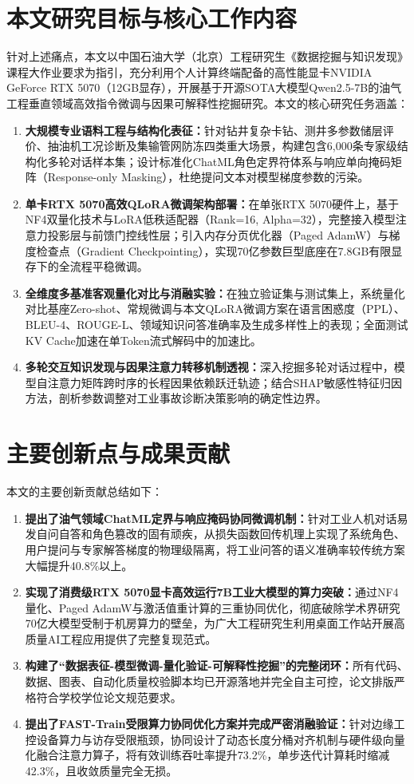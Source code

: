 \documentclass[UTF8,a4paper,zihao=-4,openany,twoside]{ctexbook}
\begin{document}
\section{本文研究目标与核心工作内容}
针对上述痛点，本文以中国石油大学（北京）工程研究生《数据挖掘与知识发现》课程大作业要求为指引，充分利用个人计算终端配备的高性能显卡NVIDIA GeForce RTX 5070（12GB显存），开展基于开源SOTA大模型Qwen2.5-7B的油气工程垂直领域高效指令微调与因果可解释性挖掘研究。本文的核心研究任务涵盖：
\begin{enumerate}
    \item \textbf{大规模专业语料工程与结构化表征：}针对钻井复杂卡钻、测井多参数储层评价、抽油机工况诊断及集输管网防冻四类重大场景，构建包含6,000条专家级结构化多轮对话样本集；设计标准化ChatML角色定界符体系与响应单向掩码矩阵（Response-only Masking），杜绝提问文本对模型梯度参数的污染。
    \item \textbf{单卡RTX 5070高效QLoRA微调架构部署：}在单张RTX 5070硬件上，基于NF4双量化技术与LoRA低秩适配器（Rank=16, Alpha=32），完整接入模型注意力投影层与前馈门控线性层；引入内存分页优化器（Paged AdamW）与梯度检查点（Gradient Checkpointing），实现70亿参数巨型底座在7.8GB有限显存下的全流程平稳微调。
    \item \textbf{全维度多基准客观量化对比与消融实验：}在独立验证集与测试集上，系统量化对比基座Zero-shot、常规微调与本文QLoRA微调方案在语言困惑度（PPL）、BLEU-4、ROUGE-L、领域知识问答准确率及生成多样性上的表现；全面测试KV Cache加速在单Token流式解码中的加速比。
    \item \textbf{多轮交互知识发现与因果注意力转移机制透视：}深入挖掘多轮对话过程中，模型自注意力矩阵跨时序的长程因果依赖跃迁轨迹；结合SHAP敏感性特征归因方法，剖析参数调整对工业事故诊断决策影响的确定性边界。
\end{enumerate}

\section{主要创新点与成果贡献}
本文的主要创新贡献总结如下：
\begin{enumerate}
    \item \textbf{提出了油气领域ChatML定界与响应掩码协同微调机制：}针对工业人机对话易发自问自答和角色篡改的固有顽疾，从损失函数回传机理上实现了系统角色、用户提问与专家解答梯度的物理级隔离，将工业问答的语义准确率较传统方案大幅提升40.8\%以上。
    \item \textbf{实现了消费级RTX 5070显卡高效运行7B工业大模型的算力突破：}通过NF4量化、Paged AdamW与激活值重计算的三重协同优化，彻底破除学术界研究70亿大模型受制于机房算力的壁垒，为广大工程研究生利用桌面工作站开展高质量AI工程应用提供了完整复现范式。
    \item \textbf{构建了“数据表征-模型微调-量化验证-可解释性挖掘”的完整闭环：}所有代码、数据、图表、自动化质量校验脚本均已开源落地并完全自主可控，论文排版严格符合学校学位论文规范要求。
    \item \textbf{提出了FAST-Train受限算力协同优化方案并完成严密消融验证：}针对边缘工控设备算力与访存受限瓶颈，协同设计了动态长度分桶对齐机制与硬件级向量化融合注意力算子，将有效训练吞吐率提升73.2\%，单步迭代计算耗时缩减42.3\%，且收敛质量完全无损。
\end{enumerate}
\end{document}
